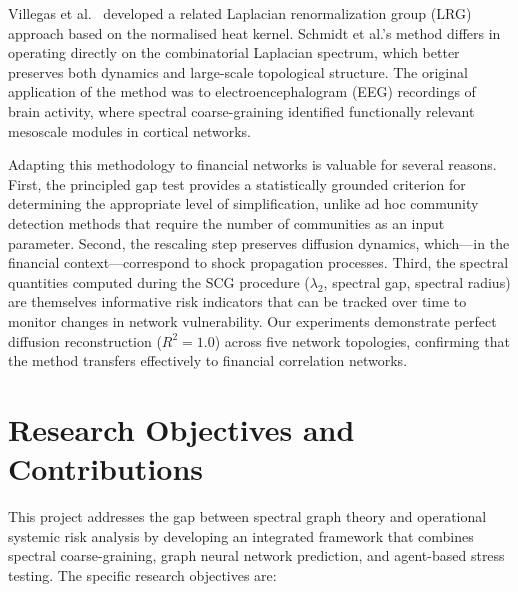 Villegas et al.~\cite{villegas2023laplacian} developed a related
Laplacian renormalization group (LRG) approach based on the normalised
heat kernel.  Schmidt et al.'s method differs in operating directly on
the combinatorial Laplacian spectrum, which better preserves both
dynamics and large-scale topological structure.  The original application
of the method was to electroencephalogram (EEG) recordings of brain
activity, where spectral coarse-graining identified functionally relevant
mesoscale modules in cortical networks.

Adapting this methodology to financial networks is valuable for several
reasons.  First, the principled gap test provides a statistically
grounded criterion for determining the appropriate level of
simplification, unlike ad hoc community detection methods that require
the number of communities as an input parameter.  Second, the rescaling
step preserves diffusion dynamics, which---in the financial
context---correspond to shock propagation processes.  Third, the spectral
quantities computed during the SCG procedure ($\lambda_2$, spectral gap,
spectral radius) are themselves informative risk indicators that can be
tracked over time to monitor changes in network vulnerability.  Our
experiments demonstrate perfect diffusion reconstruction ($R^2 = 1.0$)
across five network topologies, confirming that the method transfers
effectively to financial correlation networks.


\section{Research Objectives and Contributions}
\label{sec:objectives}

This project addresses the gap between spectral graph theory and
operational systemic risk analysis by developing an integrated framework
that combines spectral coarse-graining, graph neural network prediction,
and agent-based stress testing.  The specific research objectives are:

